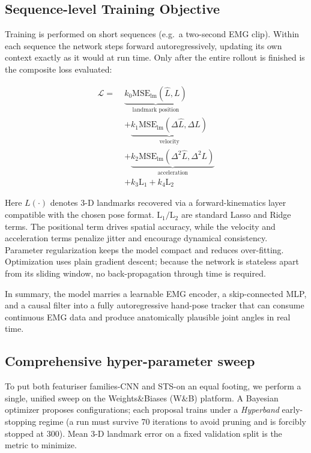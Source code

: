 \subsection{Sequence-level Training Objective}

Training is performed on short sequences (e.g.\ a two-second EMG clip).
Within each sequence the network steps forward autoregressively, updating its
own context exactly as it would at run time. Only after the entire rollout is
finished is the composite loss evaluated:

\begin{align*}
\mathcal{L} =\;&
\underbrace{k_0\mathrm{MSE}_{\text{lm}}(\hat L, L)}_{\text{landmark position}} \\
&+ \underbrace{k_1\mathrm{MSE}_{\text{lm}}(\Delta \hat L, \Delta L)}_{\text{velocity}} \\
&+ \underbrace{k_2\mathrm{MSE}_{\text{lm}}(\Delta^{2} \hat L, \Delta^{2} L)}_{\text{acceleration}} \\
&+ k_3\text{L}_{1} + k_4\text{L}_{2}
\end{align*}

Here \(L(\cdot)\) denotes 3-D landmarks recovered via a forward-kinematics layer
compatible with the chosen pose format. $\text{L}_{1} / \text{L}_{2}$ are standard Lasso and Ridge terms. The positional term drives spatial
accuracy, while the velocity and acceleration terms penalize jitter and
encourage dynamical consistency. Parameter regularization keeps the model
compact and reduces over-fitting.
Optimization uses plain gradient descent; because the network is stateless
apart from its sliding window, no back-propagation through time is required.

\medskip\noindent
In summary, the model marries a learnable EMG encoder, a skip-connected MLP,
and a causal filter into a fully autoregressive hand-pose tracker that can
consume continuous EMG data and produce anatomically plausible joint angles in
real time.

\subsection{Comprehensive hyper-parameter sweep}

To put both featuriser families-CNN and STS-on an equal footing, we perform a
single, unified sweep on the Weights\&Biases (W\&B) platform.
A Bayesian optimizer proposes configurations; each proposal trains under a
\emph{Hyperband} early-stopping regime (a run must survive 70 iterations to
avoid pruning and is forcibly stopped at 300).
Mean 3-D landmark error on a fixed validation split is the metric to minimize.

